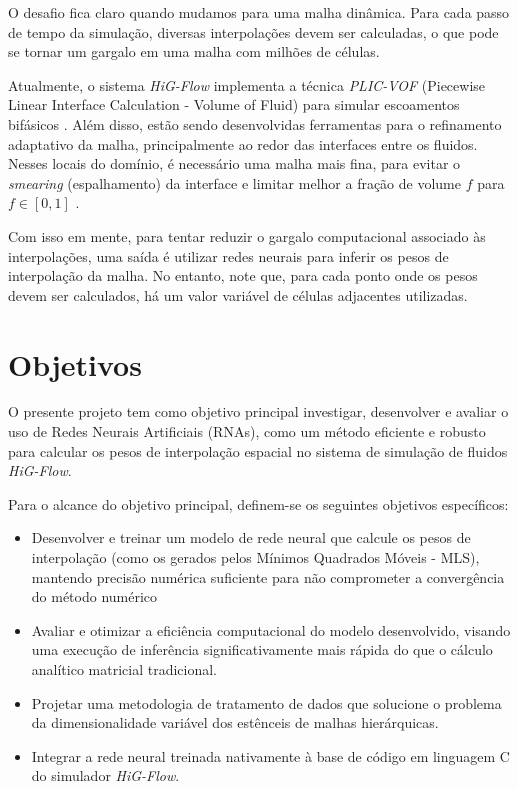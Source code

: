 \documentclass[
	12pt,				%
	oneside,			%
	a4paper,			%
	english,			%
	brazilian,				%
	]{article}
\begin{document}
	O desafio fica claro quando mudamos para uma malha dinâmica. Para cada passo de tempo da simulação, diversas interpolações devem ser calculadas, o que pode se tornar um gargalo em uma malha com milhões de células. 

	Atualmente, o sistema \textit{HiG-Flow} implementa a técnica \textit{PLIC-VOF} (Piecewise Linear Interface Calculation - Volume of Fluid) para simular escoamentos bifásicos \cite{Silva2025}. Além disso, estão sendo desenvolvidas ferramentas para o refinamento adaptativo da malha, principalmente ao redor das interfaces entre os fluidos. Nesses locais do domínio, é necessário uma malha mais fina, para evitar o \textit{smearing} (espalhamento) da interface e limitar melhor a fração de volume $f$ para $f \in [0,1]$ \cite{MARZIALE2025106794,MENCINGER2011644}.

	Com isso em mente, para tentar reduzir o gargalo computacional associado às interpolações, uma saída é utilizar redes neurais para inferir os pesos de interpolação da malha. No entanto, note que, para cada ponto onde os pesos devem ser calculados, há um valor variável de células adjacentes utilizadas.
	


	\section{Objetivos}

	O presente projeto tem como objetivo principal investigar, desenvolver e avaliar o uso de Redes Neurais Artificiais (RNAs), como um método eficiente e robusto para calcular os pesos de interpolação espacial no sistema de simulação de fluidos \textit{HiG-Flow}.

	Para o alcance do objetivo principal, definem-se os seguintes objetivos específicos:
	\begin{itemize}
		\item Desenvolver e treinar um modelo de rede neural que calcule os pesos de interpolação (como os gerados pelos Mínimos Quadrados Móveis - MLS), mantendo precisão numérica suficiente para não comprometer a convergência do método numérico
		\item Avaliar e otimizar a eficiência computacional do modelo desenvolvido, visando uma execução de inferência significativamente mais rápida do que o cálculo analítico matricial tradicional.
		\item Projetar uma metodologia de tratamento de dados que solucione o problema da dimensionalidade variável dos estênceis de malhas hierárquicas.
		\item Integrar a rede neural treinada nativamente à base de código em linguagem C do simulador \textit{HiG-Flow}.
	\end{itemize}
\end{document}
